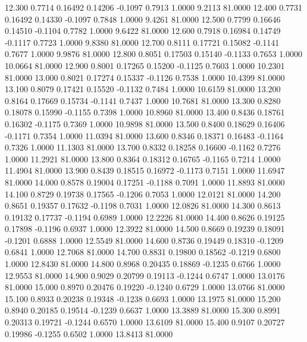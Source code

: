   12.300   0.7714   0.16492   0.14206  -0.1097   0.7913   1.0000   9.2113  81.0000
  12.400   0.7731   0.16492   0.14330  -0.1097   0.7848   1.0000   9.4261  81.0000
  12.500   0.7799   0.16646   0.14510  -0.1104   0.7782   1.0000   9.6422  81.0000
  12.600   0.7918   0.16984   0.14749  -0.1117   0.7723   1.0000   9.8380  81.0000
  12.700   0.8111   0.17721   0.15082  -0.1141   0.7677   1.0000   9.9876  81.0000
  12.800   0.8051   0.17503   0.15140  -0.1133   0.7653   1.0000  10.0664  81.0000
  12.900   0.8001   0.17265   0.15200  -0.1125   0.7603   1.0000  10.2301  81.0000
  13.000   0.8021   0.17274   0.15337  -0.1126   0.7538   1.0000  10.4399  81.0000
  13.100   0.8079   0.17421   0.15520  -0.1132   0.7484   1.0000  10.6159  81.0000
  13.200   0.8164   0.17669   0.15734  -0.1141   0.7437   1.0000  10.7681  81.0000
  13.300   0.8280   0.18078   0.15990  -0.1155   0.7398   1.0000  10.8960  81.0000
  13.400   0.8436   0.18761   0.16302  -0.1175   0.7369   1.0000  10.9898  81.0000
  13.500   0.8400   0.18629   0.16406  -0.1171   0.7354   1.0000  11.0394  81.0000
  13.600   0.8346   0.18371   0.16483  -0.1164   0.7326   1.0000  11.1303  81.0000
  13.700   0.8332   0.18258   0.16600  -0.1162   0.7276   1.0000  11.2921  81.0000
  13.800   0.8364   0.18312   0.16765  -0.1165   0.7214   1.0000  11.4904  81.0000
  13.900   0.8439   0.18515   0.16972  -0.1173   0.7151   1.0000  11.6947  81.0000
  14.000   0.8578   0.19004   0.17251  -0.1188   0.7091   1.0000  11.8893  81.0000
  14.100   0.8729   0.19738   0.17565  -0.1206   0.7053   1.0000  12.0121  81.0000
  14.200   0.8651   0.19357   0.17632  -0.1198   0.7031   1.0000  12.0826  81.0000
  14.300   0.8613   0.19132   0.17737  -0.1194   0.6989   1.0000  12.2226  81.0000
  14.400   0.8626   0.19125   0.17898  -0.1196   0.6937   1.0000  12.3922  81.0000
  14.500   0.8669   0.19239   0.18091  -0.1201   0.6888   1.0000  12.5549  81.0000
  14.600   0.8736   0.19449   0.18310  -0.1209   0.6841   1.0000  12.7068  81.0000
  14.700   0.8831   0.19800   0.18562  -0.1219   0.6800   1.0000  12.8430  81.0000
  14.800   0.8968   0.20435   0.18869  -0.1235   0.6766   1.0000  12.9553  81.0000
  14.900   0.9029   0.20799   0.19113  -0.1244   0.6747   1.0000  13.0176  81.0000
  15.000   0.8970   0.20476   0.19220  -0.1240   0.6729   1.0000  13.0766  81.0000
  15.100   0.8933   0.20238   0.19348  -0.1238   0.6693   1.0000  13.1975  81.0000
  15.200   0.8940   0.20185   0.19514  -0.1239   0.6637   1.0000  13.3889  81.0000
  15.300   0.8991   0.20313   0.19721  -0.1244   0.6570   1.0000  13.6109  81.0000
  15.400   0.9107   0.20727   0.19986  -0.1255   0.6502   1.0000  13.8413  81.0000
